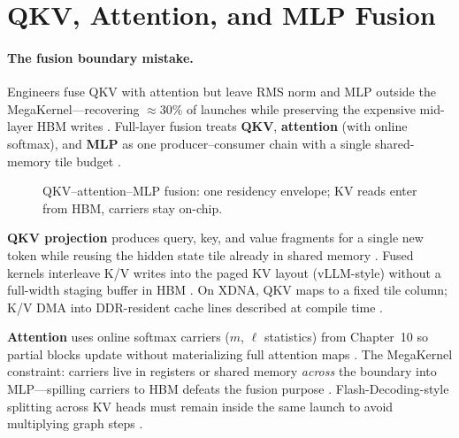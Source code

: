 \section{QKV, Attention, and MLP Fusion}
\label{sec:ch11_qkv_attn_mlp}

\paragraph{The fusion boundary mistake.} Engineers fuse QKV with attention but leave RMS norm and MLP outside the MegaKernel---recovering ${\approx}30\%$ of launches while preserving the expensive mid-layer HBM writes \citep{taxbreak2026,dao2023flashdecoding}. Full-layer fusion treats \textbf{QKV}, \textbf{attention} (with online softmax), and \textbf{MLP} as one producer--consumer chain with a single shared-memory tile budget \citep{dao2022flashattention,semianalysis2024tma}.


\begin{figure}[t]
\centering
{}
\caption{QKV--attention--MLP fusion: one residency envelope; KV reads enter from HBM, carriers stay on-chip.}
\label{fig:qkv_attn_mlp_architecture}
\end{figure}

\textbf{QKV projection} produces query, key, and value fragments for a single new token while reusing the hidden state tile already in shared memory \citep{nvidia2022hopper}. Fused kernels interleave K/V writes into the paged KV layout (vLLM-style) without a full-width staging buffer in HBM \citep{kwon2023vllm}. On XDNA, QKV maps to a fixed tile column; K/V DMA into DDR-resident cache lines described at compile time \citep{amd2024xdna,yirage2026}.

\textbf{Attention} uses online softmax carriers ($m$, $\ell$ statistics) from Chapter~10 so partial blocks update without materializing full attention maps \citep{dao2022flashattention}. The MegaKernel constraint: carriers live in registers or shared memory \emph{across} the boundary into MLP---spilling carriers to HBM defeats the fusion purpose \citep{memoryfloor2026}. Flash-Decoding-style splitting across KV heads must remain inside the same launch to avoid multiplying graph steps \citep{dao2023flashdecoding}.

